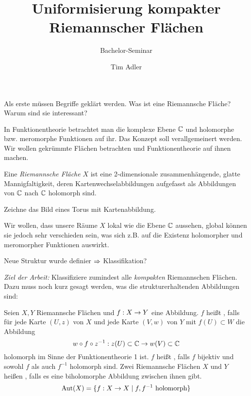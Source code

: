 

\title{Uniformisierung kompakter Riemannscher Flächen}
\subtitle{Bachelor-Seminar}
\author{Tim Adler}



\maketitle

Als erste müssen Begriffe geklärt werden. Was ist eine Riemannsche
Fläche? Warum sind sie interessant?

In Funktionentheorie betrachtet man die komplexe Ebene $\mathbb{C}$ und
holomorphe bzw. meromorphe Funktionen auf ihr. Das Konzept soll
verallgemeinert werden. Wir wollen gekrümmte Flächen betrachten und
Funktionentheorie auf ihnen machen.

\begin{defin}
  \label{def:rf}
  Eine \emph{Riemannsche Fläche} $X$ ist eine 2-dimensionale
  zusammenhängende, glatte Mannigfaltigkeit, deren
  Kartenwechselabbildungen aufgefasst als Abbildungen von $\mathbb{C}$ nach
  $\mathbb{C}$ holomorph sind.
\end{defin}

Zeichne das Bild eines Torus mit Kartenabbildung.

Wir wollen, dass unsere Räume $X$ lokal wie die Ebene $\mathbb{C}$ aussehen,
global können sie jedoch sehr verschieden sein, was sich z.B. auf die
Existenz holomorpher und meromorpher Funktionen auswirkt.

Neue Struktur wurde definier $\Rightarrow$ Klassifikation? 

\emph{Ziel der Arbeit:} Klassifiziere zumindest alle \emph{kompakten}
Riemannschen Flächen. Dazu muss noch kurz gesagt werden, was die
strukturerhaltenden Abbildungen sind:

\begin{defin}
  Seien $X,Y$ Riemannsche Flächen und $f: X \rightarrow Y$ eine Abbildung. $f$
  heißt , falls für jede Karte $(U,z)$ von $X$ und
  jede Karte $(V, w)$ von $Y$ mit $f(U) \subset W$ die Abbildung
  \[
  w \circ f \circ z^{-1} : z(U) \subset \mathbb{C} \rightarrow w(V) \subset \mathbb{C}
  \]
  holomorph im Sinne der Funktionentheorie 1 ist. $f$ heißt
  , falls $f$ bijektiv und sowohl $f$ als auch $f^{-1}$
  holomorph sind. Zwei Riemannsche Flächen $X$ und $Y$ heißen , falls es eine biholomorphe Abbildung zwischen ihnen
  gibt.
  \[
  \operatorname{Aut}(X) = \{ f: X \rightarrow X \mid f, f^{-1} \text{ holomorph}\}
  \]
\end{defin}

